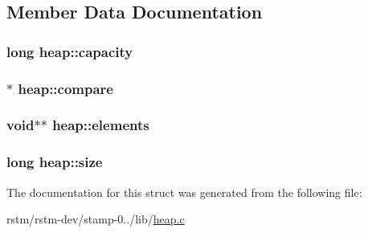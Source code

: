 \subsection{Member Data Documentation}
\hypertarget{structheap_a305bf428a6dde4af0892158224bcf384}{
\subsubsection[{capacity}]{\setlength{\rightskip}{0pt plus 5cm}long heap\-::capacity}}\label{structheap_a305bf428a6dde4af0892158224bcf384}
\hypertarget{structheap_a721a775958a330f128dbc7336b0750d3}{
\subsubsection[{compare}]{$\ast$ heap\-::compare}}\label{structheap_a721a775958a330f128dbc7336b0750d3}
\hypertarget{structheap_a77bfb4715fa5fdeb209cb3170023723e}{
\subsubsection[{elements}]{\setlength{\rightskip}{0pt plus 5cm}void$\ast$$\ast$ heap\-::elements}}\label{structheap_a77bfb4715fa5fdeb209cb3170023723e}
\hypertarget{structheap_ac993596e66a66fe5fb11304ec781f8eb}{
\subsubsection[{size}]{\setlength{\rightskip}{0pt plus 5cm}long heap\-::size}}\label{structheap_ac993596e66a66fe5fb11304ec781f8eb}


The documentation for this struct was generated from the following file\-:\begin{DoxyCompactItemize}
\item 
rstm/rstm-\/dev/stamp-\/0../lib/\hyperlink{heap_8c}{heap.\-c}\end{DoxyCompactItemize}
